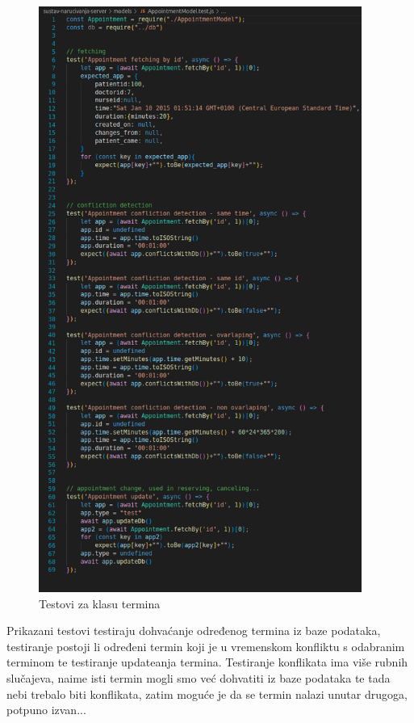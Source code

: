             \begin{figure}[H]
                    \includegraphics[width=300pt]{slike/appointment_tests_code.png} %
                    \caption{Testovi za klasu termina}
                    \label{fig:test3} %
                \end{figure}
                Prikazani testovi testiraju dohvaćanje određenog termina iz baze podataka, testiranje postoji li određeni termin koji je u vremenskom konfliktu s odabranim terminom te testiranje updateanja termina. Testiranje konflikata ima više rubnih slučajeva, naime isti termin mogli smo već dohvatiti iz baze podataka te tada nebi trebalo biti konflikata, zatim moguće je da se termin nalazi unutar drugoga, potpuno izvan...

